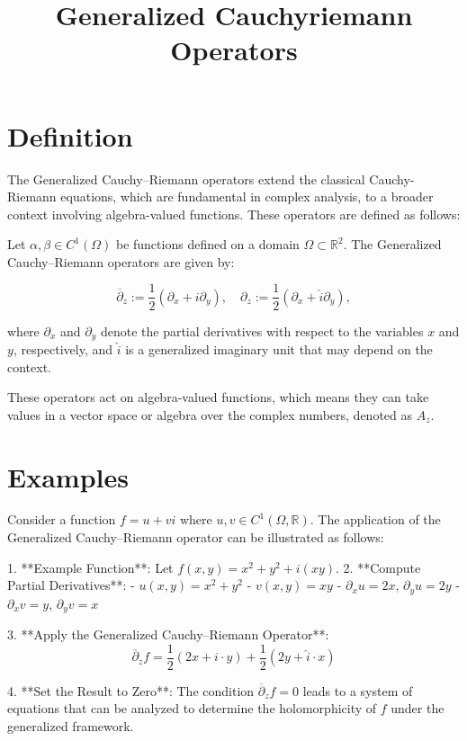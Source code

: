 \documentclass[11pt,a4paper]{article}
\title{Generalized Cauchyriemann Operators}
\date{}
\begin{document}
\maketitle
\section{Definition}
The Generalized Cauchy–Riemann operators extend the classical Cauchy-Riemann equations, which are fundamental in complex analysis, to a broader context involving algebra-valued functions. These operators are defined as follows:

Let \( \alpha, \beta \in C^1(\Omega) \) be functions defined on a domain \( \Omega \subset \mathbb{R}^2 \). The Generalized Cauchy–Riemann operators are given by:

\begin{equation}
\overline{\partial}_z := \frac{1}{2} \left( \partial_x + i \partial_y \right),
\quad
\partial_z := \frac{1}{2} \left( \partial_x + \hat{i} \partial_y \right),
\end{equation}

where \( \partial_x \) and \( \partial_y \) denote the partial derivatives with respect to the variables \( x \) and \( y \), respectively, and \( \hat{i} \) is a generalized imaginary unit that may depend on the context.

These operators act on algebra-valued functions, which means they can take values in a vector space or algebra over the complex numbers, denoted as \( A_z \).

\section{Examples}
Consider a function \( f = u + vi \) where \( u, v \in C^1(\Omega, \mathbb{R}) \). The application of the Generalized Cauchy–Riemann operator can be illustrated as follows:

1. **Example Function**: Let \( f(x, y) = x^2 + y^2 + i(xy) \).
2. **Compute Partial Derivatives**:
   - \( u(x, y) = x^2 + y^2 \)
   - \( v(x, y) = xy \)
   - \( \partial_x u = 2x \), \( \partial_y u = 2y \)
   - \( \partial_x v = y \), \( \partial_y v = x \)

3. **Apply the Generalized Cauchy–Riemann Operator**:
   \[
   \overline{\partial}_z f = \frac{1}{2} \left( 2x + i \cdot y \right) + \frac{1}{2} \left( 2y + \hat{i} \cdot x \right)
   \]

4. **Set the Result to Zero**:
   The condition \( \overline{\partial}_z f = 0 \) leads to a system of equations that can be analyzed to determine the holomorphicity of \( f \) under the generalized framework.
\end{document}
